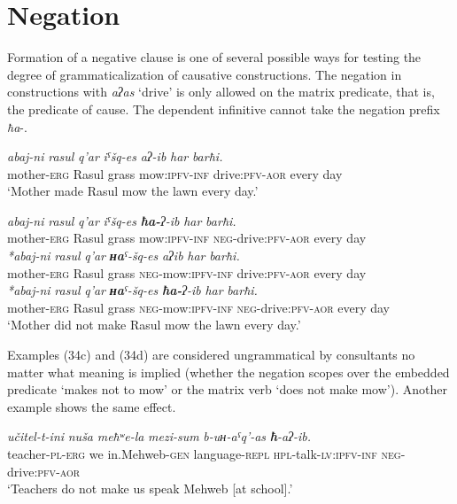 ﻿\documentclass[output=paper]{langsci/langscibook}
\begin{document}
\section{Negation}\label{Negation}


Formation of a negative clause is one of several possible ways for testing the
degree of grammaticalization of causative constructions. The negation in
constructions with \emph{aʔas} `drive' is only allowed on the matrix
predicate, that is, the predicate of cause. The dependent infinitive
cannot take the negation prefix \emph{ħa}-.

\ea %
\ea %
\gll \emph{abaj-ni} \emph{rasul} \emph{q'ar} \emph{iˤšq-es}  \emph{aʔ-ib} \emph{har} \emph{barħi.}\\
 mother-\textsc{erg} Rasul grass mow:\textsc{ipfv}-\textsc{inf}  drive:\textsc{pfv}-\textsc{aor} every day\\
\glt `Mother made Rasul mow the lawn every day.'

\ex %
\gll \emph{abaj-ni} \emph{rasul} \emph{q'ar} \emph{iˤšq-es} \emph{\textbf{ħa-}ʔ-ib} \emph{har} \emph{barħi.}\\
mother-\textsc{erg} Rasul grass mow:\textsc{ipfv}-\textsc{inf} \textsc{neg}-drive:\textsc{pfv}-\textsc{aor} every day\\

\ex %
\gll \emph{*abaj-ni} \emph{rasul} \emph{q'ar} \emph{\textbf{ʜa}ˤ{-}šq-es}  \emph{aʔib} \emph{har} \emph{barħi.}\\
mother-\textsc{erg} Rasul grass \textsc{neg}-mow:\textsc{ipfv}-\textsc{inf} drive:\textsc{pfv}-\textsc{aor} every day\\

\ex %
\gll \emph{*abaj-ni} \emph{rasul} \emph{q'ar} \emph{\textbf{ʜa}ˤ-šq-es}  \emph{\textbf{ħa-}ʔ-ib}  \emph{har} \emph{barħi.}\\
mother-\textsc{erg} Rasul grass \textsc{neg}-mow:\textsc{ipfv}-\textsc{inf} \textsc{neg}-drive:\textsc{pfv}-\textsc{aor} every  day\\
\glt `Mother did not make Rasul mow the lawn every day.'
\z
\z

Examples (34c) and (34d) are considered ungrammatical by consultants
no matter what meaning is implied (whether the negation scopes over the
embedded predicate `makes not to mow' or the matrix verb `does not make
mow'). Another example shows the same effect.

\ea %
\ea %
\gll \emph{učitel-t-ini} \emph{nuša} \emph{meħʷe-la} \emph{mezi-sum} \emph{b-uʜ-aˤq'-as} \emph{\textbf{ħ}-aʔ-ib.}\\
teacher-\textsc{pl}-\textsc{erg} we in.Mehweb-\textsc{gen} language-\textsc{repl} \textsc{hpl}-talk-\textsc{lv}:\textsc{ipfv}-\textsc{inf} \textsc{neg}-drive:\textsc{pfv}-\textsc{aor}\\
\glt  `Teachers do not make us speak Mehweb [at school].'
\end{document}
